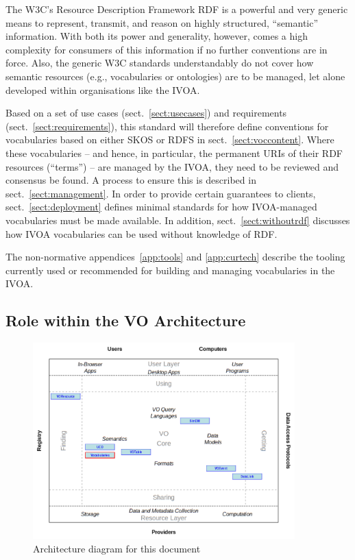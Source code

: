 \documentclass[11pt,a4paper]{ivoa}
\begin{document}
The W3C's Resource Description Framework RDF \citep{note:rdfprimer} is a powerful
and very generic means to represent, transmit, and reason on highly
structured, ``semantic'' information.  With both its power and
generality, however, comes a high complexity for consumers of this
information if no further conventions are in force.  Also, the generic
W3C standards understandably do not cover how semantic resources (e.g.,
vocabularies or ontologies) are to be managed, let alone developed
within organisations like the IVOA.

Based on a set of use cases (sect.~\ref{sect:usecases}) and requirements
(sect.~\ref{sect:requirements}), this standard will therefore define
conventions for
vocabularies based on either SKOS or RDFS in
sect.~\ref{sect:voccontent}.  Where these vocabularies -- and hence, in
particular, the permanent URIs of their RDF resources (``terms'') 
-- are managed by the
IVOA, they need to be reviewed and consensus be found.  A process to
ensure this is described in
sect.~\ref{sect:management}.  In order
to provide certain guarantees to clients, sect.~\ref{sect:deployment}
defines minimal standards for how IVOA-managed vocabularies must be made
available.  In addition, sect.~\ref{sect:withoutrdf} discusses how IVOA
vocabularies can be used without knowledge of RDF.

The non-normative appendices~\ref{app:tools} and \ref{app:curtech} 
describe the tooling
currently used or recommended for building and managing vocabularies in the
IVOA.


\subsection{Role within the VO Architecture}

\begin{figure}
\centering

\includegraphics[width=0.9\textwidth]{role_diagram.pdf}
\caption{Architecture diagram for this document}
\label{fig:archdiag}
\end{figure}
\end{document}
